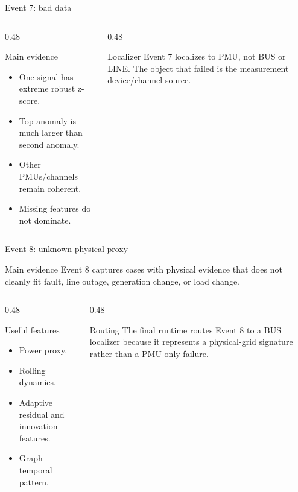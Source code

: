 ﻿\documentclass[10pt,aspectratio=169]{beamer}
\begin{document}
\begin{frame}{Event 7: bad data}
\small
\begin{columns}[T,totalwidth=\textwidth]
\begin{column}{0.48\textwidth}
\begin{block}{Main evidence}
\begin{itemize}
  \item One signal has extreme robust z-score.
  \item Top anomaly is much larger than second anomaly.
  \item Other PMUs/channels remain coherent.
  \item Missing features do not dominate.
\end{itemize}
\end{block}
\end{column}
\begin{column}{0.48\textwidth}
\begin{alertblock}{Localizer}
Event 7 localizes to PMU, not BUS or LINE. The object that failed is the measurement device/channel source.
\end{alertblock}
\end{column}
\end{columns}
\end{frame}

\begin{frame}{Event 8: unknown physical proxy}
\small
\begin{block}{Main evidence}
Event 8 captures cases with physical evidence that does not cleanly fit fault, line outage, generation change, or load change.
\end{block}
\begin{columns}[T,totalwidth=\textwidth]
\begin{column}{0.48\textwidth}
\begin{exampleblock}{Useful features}
\begin{itemize}
  \item Power proxy.
  \item Rolling dynamics.
  \item Adaptive residual and innovation features.
  \item Graph-temporal pattern.
\end{itemize}
\end{exampleblock}
\end{column}
\begin{column}{0.48\textwidth}
\begin{alertblock}{Routing}
The final runtime routes Event 8 to a BUS localizer because it represents a physical-grid signature rather than a PMU-only failure.
\end{alertblock}
\end{column}
\end{columns}
\end{frame}
\end{document}
